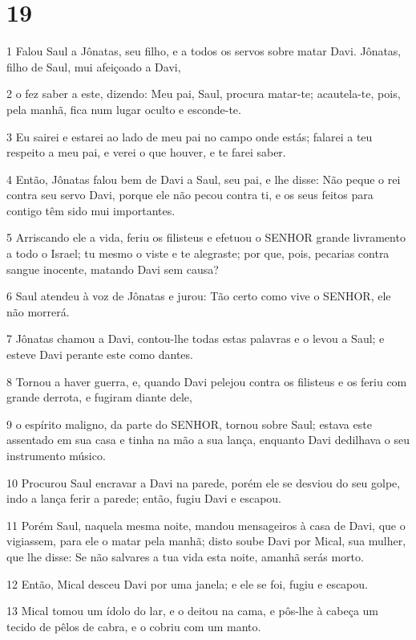 \chapter{19}

\par 1 Falou Saul a Jônatas, seu filho, e a todos os servos sobre matar Davi. Jônatas, filho de Saul, mui afeiçoado a Davi,
\par 2 o fez saber a este, dizendo: Meu pai, Saul, procura matar-te; acautela-te, pois, pela manhã, fica num lugar oculto e esconde-te.
\par 3 Eu sairei e estarei ao lado de meu pai no campo onde estás; falarei a teu respeito a meu pai, e verei o que houver, e te farei saber.
\par 4 Então, Jônatas falou bem de Davi a Saul, seu pai, e lhe disse: Não peque o rei contra seu servo Davi, porque ele não pecou contra ti, e os seus feitos para contigo têm sido mui importantes.
\par 5 Arriscando ele a vida, feriu os filisteus e efetuou o SENHOR grande livramento a todo o Israel; tu mesmo o viste e te alegraste; por que, pois, pecarias contra sangue inocente, matando Davi sem causa?
\par 6 Saul atendeu à voz de Jônatas e jurou: Tão certo como vive o SENHOR, ele não morrerá.
\par 7 Jônatas chamou a Davi, contou-lhe todas estas palavras e o levou a Saul; e esteve Davi perante este como dantes.
\par 8 Tornou a haver guerra, e, quando Davi pelejou contra os filisteus e os feriu com grande derrota, e fugiram diante dele,
\par 9 o espírito maligno, da parte do SENHOR, tornou sobre Saul; estava este assentado em sua casa e tinha na mão a sua lança, enquanto Davi dedilhava o seu instrumento músico.
\par 10 Procurou Saul encravar a Davi na parede, porém ele se desviou do seu golpe, indo a lança ferir a parede; então, fugiu Davi e escapou.
\par 11 Porém Saul, naquela mesma noite, mandou mensageiros à casa de Davi, que o vigiassem, para ele o matar pela manhã; disto soube Davi por Mical, sua mulher, que lhe disse: Se não salvares a tua vida esta noite, amanhã serás morto.
\par 12 Então, Mical desceu Davi por uma janela; e ele se foi, fugiu e escapou.
\par 13 Mical tomou um ídolo do lar, e o deitou na cama, e pôs-lhe à cabeça um tecido de pêlos de cabra, e o cobriu com um manto.
